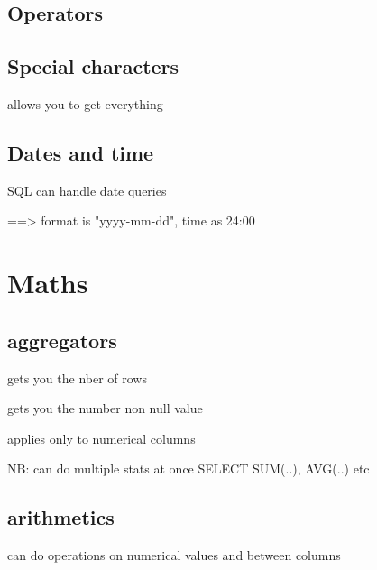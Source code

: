 	\subsection{Operators}



		\code{=}

		\code{!=}

	\subsection{Special characters}

		\code{*} allows you to get everything

	\subsection{Dates and time}

		SQL can handle date queries

		 ==> format is "yyyy-mm-dd", time as 24:00




\section{Maths}

	\subsection{aggregators}

		 gets you the nber of rows

		 gets you the number non null value

		 applies only to numerical columns



		NB: can do multiple stats at once SELECT SUM(..), AVG(..) etc

	\subsection{arithmetics}

		can do operations on numerical values and between columns



